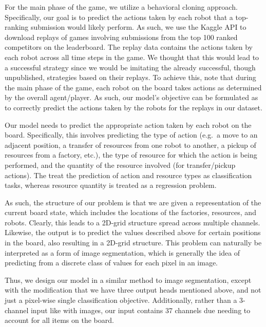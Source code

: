 \documentclass[10pt,twocolumn,letterpaper]{article}
\begin{document}
For the main phase of the game, we utilize a behavioral cloning\cite{cloning}
approach. Specifically, our goal is to predict the actions taken
by each robot that a top-ranking submission would likely perform.
As such, we use the Kaggle API to download replays of games
involving submissions from the top 100 ranked competitors on the leaderboard.
The replay data contains the actions taken by
each robot across all time steps in the game.
We thought that this would lead to a successful strategy
since we would be imitating the already successful,
though unpublished, strategies based on their replays.
To achieve this, note that during the main phase of the game, each robot
on the board takes actions as determined by the overall agent/player.
As such, our model's objective can be formulated as to correctly
predict the actions taken by the robots for the replays in our dataset.

Our model needs to predict the appropriate
action taken by each robot on the board.
Specifically, this involves predicting the type of action (e.g.\ a move to
an adjacent position, a transfer of resources from one robot to another, a
pickup of resources from a factory, etc.), the type of resource for which
the action is being performed, and the quantity of the resource involved
(for transfer/pickup actions).
The treat the prediction of action and resource types as classification
tasks, whereas resource quantity is treated as a regression problem.

As such, the structure of our problem is that we are given a
representation of the current board state, which includes
the locations of the factories, resources, and robots.
Clearly, this leads to a 2D-grid structure spread across multiple channels.
Likewise, the output is to predict the values described above for
certain positions in the board, also resulting in a 2D-grid structure.
This problem can naturally be interpreted as a form of
image segmentation, which is generally the idea of predicting
from a discrete class of values for each pixel in an image.

Thus, we design our model in a similar method to image segmentation,
except with the modification that we have three output heads mentioned
above, and not just a pixel-wise single classification objective.
Additionally, rather than a 3-channel input like with images, our input
contains 37 channels due needing to account for all items on the board.
\end{document}
